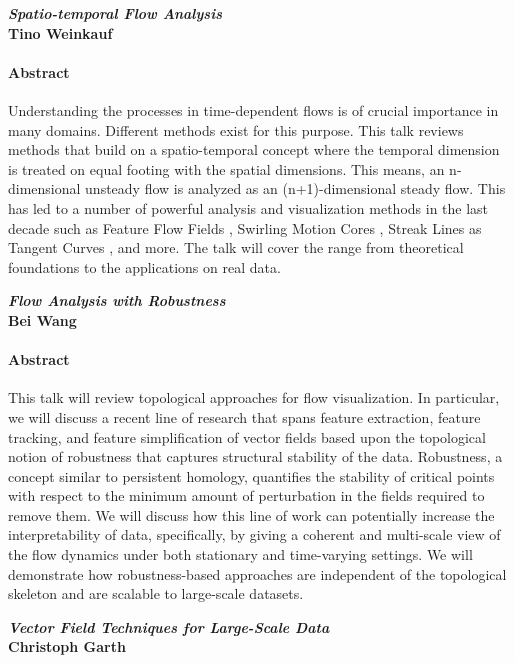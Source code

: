 \documentclass[preprint,journal]{vgtc}       %
\newcommand{\addverticalspace}{\vspace{3mm}}
\begin{document}
\noindent\textbf{\textit{Spatio-temporal Flow Analysis}}\\
\textbf{Tino Weinkauf}
\paragraph{Abstract}
Understanding the processes in time-dependent flows is of crucial importance in many domains. Different methods exist for this purpose. This talk reviews methods that build on a spatio-temporal concept where the temporal dimension is treated on equal footing with the spatial dimensions. This means, an n-dimensional unsteady flow is analyzed as an (n+1)-dimensional steady flow. This has led to a number of powerful analysis and visualization methods in the last decade such as Feature Flow Fields \cite{theisel03b, weinkauf11b}, Swirling Motion Cores \cite{weinkauf07c}, Streak Lines as Tangent Curves \cite{weinkauf10c, weinkauf12a}, and more. The talk will cover the range from theoretical foundations to the applications on real data.

\addverticalspace

\noindent\textbf{\textit{Flow Analysis with Robustness}}\\
\textbf{Bei Wang}
\paragraph{Abstract}
This talk will review topological approaches for flow visualization. In particular, we will discuss a recent line of research that spans feature extraction, feature tracking, and feature simplification of vector fields based upon the topological notion of robustness that captures structural stability of the data. Robustness, a concept similar to persistent homology, quantifies the stability of critical points with respect to the minimum amount of perturbation in the fields required to remove them. We will discuss how this line of work can potentially increase the interpretability of data, specifically, by giving a coherent and multi-scale view of the flow dynamics under both stationary and time-varying settings. We will demonstrate how robustness-based approaches are independent of the topological skeleton and are scalable to large-scale datasets.

\addverticalspace

\noindent\textbf{\textit{Vector Field Techniques for Large-Scale Data}}\\
\textbf{Christoph Garth}
\end{document}
